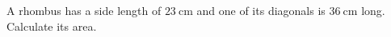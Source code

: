 A rhombus has a side length of $\SI{23}{\cm}$ and one of its diagonals is $\SI{36}{\cm}$ long. Calculate its area.
